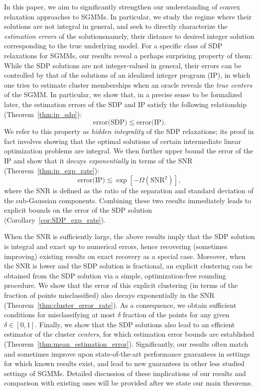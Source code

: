 In this paper, we aim to significantly strengthen our understanding
of convex relaxation approaches to SGMMs. In particular, we study
the regime where their solutions are not integral in general, and
seek to directly characterize the \emph{estimation errors} of the
solutions\textemdash namely, their distance to desired integer solution
corresponding to the true underlying model. For a specific class of
SDP relaxations for SGMMs, our results reveal a perhaps surprising
property of them: While the SDP solutions are not integer-valued in
general, their errors can be controlled by that of the solutions of
an idealized integer program (IP), in which one tries to estimate
cluster memberships when an oracle reveals the \emph{true centers}
of the SGMM. In particular, we show that, in a precise sense to be
formalized later, the estimation errors of the SDP and IP satisfy
the following relationship (Theorem~\ref{thm:ip_sdp}):
\[
\text{error(SDP)}\lesssim\text{error(IP)}.
\]
We refer to this property as \emph{hidden integrality} of the SDP
relaxations; its proof in fact involves showing that the optimal solutions
of certain intermediate linear optimization problems are integral.
We then further upper bound the error of the IP and show that it decays
\emph{exponentially }in terms of the SNR (Theorem~\ref{thm:ip_exp_rate}):
\[
\text{error(IP)}\lesssim\exp\left[-\Omega(\text{SNR}^{2})\right],
\]
where the SNR is defined as the ratio of the separation and standard
deviation of the sub-Gaussian components. Combining these two results
immediately leads to explicit bounds on the error of the SDP solution
(Corollary~\ref{cor:SDP_exp_rate}). 

When the SNR is sufficiently large, the above results imply that the
SDP solution is integral and exact up to numerical errors, hence recovering
(sometimes improving) existing results on exact recovery as a special
case. Moreover, when the SNR is lower and the SDP solution is fractional,
an explicit clustering can be obtained from the SDP solution via a
simple, optimization-free rounding procedure. We show that the error
of this explicit clustering (in terms of the fraction of points misclassified)
also decays exponentially in the SNR (Theorem~\ref{thm:cluster_error_rate}).
As a consequence, we obtain sufficient conditions for misclassifying
at most $\delta$ fraction of the points for any given $\delta\in[0,1]$.
Finally, we show that the SDP solutions also lead to an efficient
estimator of the cluster \emph{centers}, for which estimation error
bounds are established (Theorem~\ref{thm:mean_estimation_error}).
Significantly, our results often match and sometimes improve upon
state-of-the-art performance guarantees in settings for which known
results exist, and lead to new guarantees in other less studied settings
of SGMMs. Detailed discussion of these implications of our results
and comparison with existing ones will be provided after we state
our main theorems.

